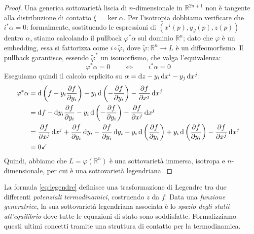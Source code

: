\begin{proof}
    Una generica sottovarietà liscia di $n$-dimensionale in $\mathbb{R}^{2n + 1}$ non è tangente alla distribuzione di contatto $\xi = \ker \alpha$.
    Per l'isotropia dobbiamo verificare che $i^* \alpha = 0$: formalmente, sostituendo le espressioni di $\left( x^I (p), y_J(p), z(p)\right)$ dentro $\alpha$, stiamo calcolando il pullback $\varphi^* \alpha$ sul dominio $\mathbb{R}^n$; dato che $\varphi$ è un embedding, essa si fattorizza come $i \circ \tilde\varphi$, dove $\tilde\varphi : \mathbb{R}^n \longrightarrow L$ è un diffeomorfismo.
    Il pullback garantisce, essendo $\tilde\varphi^*$ un isomorfismo, che valga l'equivalenza:
    \[
        \varphi^* \alpha = 0 \qquad \Longleftrightarrow \qquad i^* \alpha = 0
    \]
    Eseguiamo quindi il calcolo esplicito su $\alpha = \odif{z} - y_i \odif{x^i} - y_j \odif{x^j}$:
    \begin{align*}
        \varphi^* \alpha & = \odif{\left( f - y_i \pdv{f}{y_i} \right)} - y_i \odif{\left( - \pdv{f}{y_i} \right)} - \pdv{f}{x^j} \odif{x^j}                                                                         \\
                         & = \odif{f} - \odif{y_i \pdv{f}{y_i}} - y_i \odif{\left( - \pdv{f}{y_i} \right)} - \pdv{f}{x^j} \odif{x^j}                                                                                 \\
                         & = \pdv{f}{x^j} \odif{x^j} + \pdv{f}{y_i} \odif{y_i} - \pdv{f}{y_i} \odif{y_i} - y_i \odif{\left( \pdv{f}{y_i} \right)} + y_i \odif{\left( \pdv{f}{y_i} \right)} - \pdv{f}{x^j} \odif{x^j} \\
                         & = 0 \checkmark
    \end{align*}
    Quindi, abbiamo che $L = \varphi(\mathbb{R}^n)$ è una sottovarietà immersa, isotropa e $n$-dimensionale, per cui è una sottovarietà legendriana.
\end{proof}

La formula \eqref{eq:legendre} definisce una trasformazione di Legendre tra due differenti \emph{potenziali termodinamici}, costruendo $z$ da $f$.
Data una \emph{funzione generatrice}, la sua sottovarietà legendriana associata è lo \emph{spazio degli statii all'equilibrio} dove tutte le equazioni di stato sono soddisfatte.
Formalizziamo questi ultimi concetti tramite una struttura di contatto per la termodinamica.